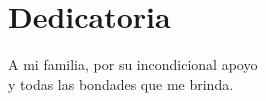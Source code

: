 \chapter*{Dedicatoria}
\doublespacing %

A mi familia, por su incondicional apoyo\\
y todas las bondades que me brinda.